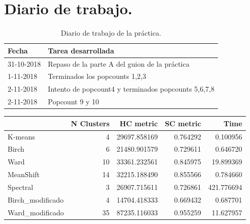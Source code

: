 	\newpage %
	
	\tableofcontents %
	
	\listoffigures %
	
	\listoftables %
	
	\newpage
	
	\section[Diario de trabajo]{Diario de trabajo.}
		
	\begin{table}[htbp]
		\begin{center}
			\begin{tabular}{|l|l|}
				\hline
				Fecha & Tarea desarrollada \\
				\hline \hline
				31-10-2018 & Repaso de la parte A del guion de la práctica \\ \hline
				1-11-2018 & Terminados los popcounts 1,2,3 \\ \hline
				2-11-2018 & Intento de popcount4 y terminados popcounts 5,6,7,8 \\ \hline
				2-11-2018 & Popcount 9 y 10 \\ \hline
			\end{tabular}
			\caption{Diario de trabajo de la práctica.}
			\label{tabla:sencilla}
		\end{center}
	\end{table}
	
	
	\begin{tabular}{lrrrr}
		\toprule
		{} &  N Clusters &     HC metric &  SC metric &        Time \\
		\midrule
		K-means          &           4 &  29697.858169 &   0.764292 &    0.100956 \\
		Birch            &           6 &  21480.901579 &   0.729611 &    0.646720 \\
		Ward             &          10 &  33361.232561 &   0.845975 &   19.899369 \\
		MeanShift        &          14 &  32215.188490 &   0.855566 &    0.784660 \\
		Spectral         &           3 &  26907.715611 &   0.726861 &  421.776694 \\
		Birch\_modificado &           4 &  14704.418333 &   0.669432 &    0.687701 \\
		Ward\_modificado  &          35 &  87235.116033 &   0.955259 &   11.627957 \\
		\bottomrule
	\end{tabular}
	
